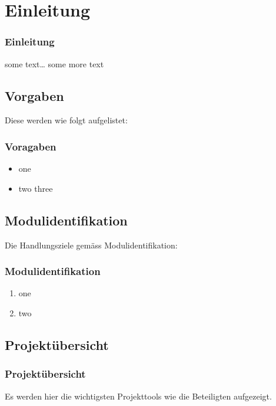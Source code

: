 \mode*

\section{Einleitung}
\label{sec:einleitung}

\begin{frame}[fragile]
    \frametitle<presentation>{Einleitung}
    some text\ldots
    some more text
\end{frame}


\subsection{Vorgaben}
\label{subsec:vorgaben}
Diese werden wie folgt aufgelistet:
\begin{frame}[fragile]
    \frametitle<presentation>{Voragaben}

    \begin{itemize}
        \item one
        \item two three
    \end{itemize}
\end{frame}


\subsection{Modulidentifikation}
\label{subsec:modulid}
Die Handlungsziele gemäss Modulidentifikation:
\begin{frame}[fragile]
    \frametitle<presentation>{Modulidentifikation}
    \begin{enumerate}
        \item one
        \item two
    \end{enumerate}
\end{frame}


\subsection{Projektübersicht}\label{subsec:projekt}
\begin{frame}[fragile]
    \frametitle<presentation>{Projektübersicht}
    Es werden hier die wichtigsten Projekttools wie die Beteiligten aufgezeigt.
\end{frame}

